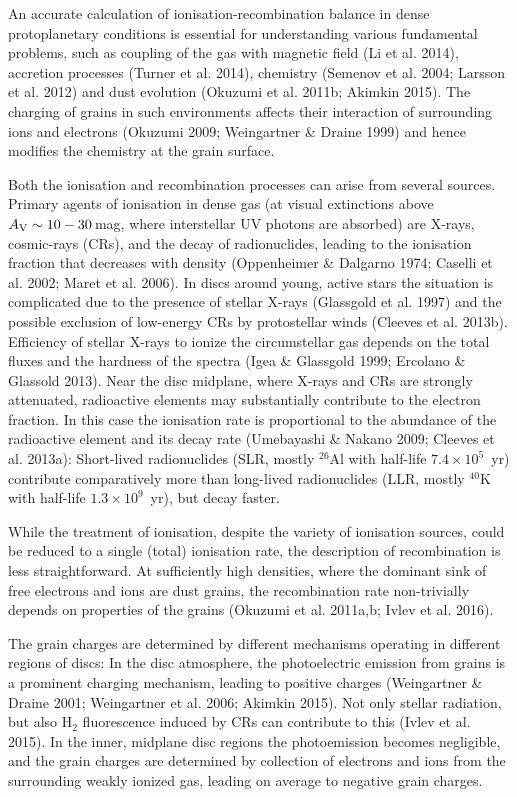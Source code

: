 \documentclass[10pt,fleqn,twoside]{article}
\begin{document}
An accurate calculation of ionisation-recombination balance in dense protoplanetary conditions is essential for
understanding various fundamental problems, such as coupling of the gas with magnetic field (Li et al. 2014), accretion
processes (Turner et al. 2014), chemistry (Semenov et al. 2004; Larsson et al. 2012) and dust evolution (Okuzumi et al. 2011b; Akimkin 2015). The charging of grains in such environments affects their interaction of surrounding ions and electrons
(Okuzumi 2009; Weingartner \& Draine 1999) and hence modifies the chemistry at the grain surface.

Both the ionisation and recombination processes can arise from several sources. Primary agents of ionisation in dense gas
(at visual extinctions above $A_{\rm V}\sim 10-30$\,mag, where interstellar UV photons are absorbed) are X-rays, cosmic-rays (CRs), and the decay of radionuclides, leading to the ionisation fraction that decreases with density (Oppenheimer \& Dalgarno 1974; Caselli et al. 2002; Maret et al. 2006). In discs around young, active stars the situation is complicated due to the presence of stellar X-rays (Glassgold et al. 1997) and the possible exclusion of low-energy CRs by protostellar winds (Cleeves et al. 2013b). Efficiency of stellar X-rays to ionize the circumstellar gas depends on the total fluxes and the hardness of the spectra (Igea \& Glassgold 1999; Ercolano \& Glassold 2013). Near the disc midplane, where X-rays and CRs are strongly attenuated, radioactive elements may substantially contribute to the electron fraction. In this case the ionisation rate is proportional to the abundance of the radioactive element and its decay rate (Umebayashi \& Nakano 2009; Cleeves et al. 2013a): Short-lived radionuclides (SLR, mostly $^{26}$Al with half-life $7.4\times 10^5$~yr) contribute comparatively more than long-lived radionuclides (LLR, mostly $^{40}$K with half-life $1.3\times 10^9$~yr), but decay faster.

While the treatment of ionisation, despite the variety of ionisation sources, could be reduced to a single (total)
ionisation rate, the description of recombination is less straightforward. At sufficiently high densities, where the
dominant sink of free electrons and ions are dust grains, the recombination rate non-trivially depends on properties of the
grains (Okuzumi et al. 2011a,b; Ivlev et al. 2016).

The grain charges are determined by different mechanisms operating in different regions of discs: In the disc atmosphere, the
photoelectric emission from grains is a prominent charging mechanism, leading to positive charges (Weingartner \& Draine 2001; Weingartner et al. 2006; Akimkin 2015). Not only stellar radiation, but also H$_2$ fluorescence induced by CRs can contribute to this (Ivlev et al. 2015). In the inner, midplane disc regions the photoemission becomes negligible, and the grain charges are determined by collection of electrons and ions from the surrounding weakly ionized gas, leading on average to negative grain charges.
\end{document}
